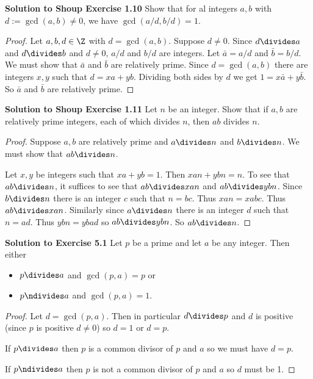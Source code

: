\documentclass[oneside,12pt]{amsart}
\begin{document}
\bigskip

\textbf{Solution to Shoup Exercise 1.10} Show that for al integers $a,b$ with $d:= \gcd(a,b) \not= 0$, we have $\gcd(a/d,b/d)=1$.
\begin{proof}
Let $a,b,d\in \Z$ with $d=\gcd(a,b)$. Suppose $d\not=0$.
Since $d\divides a$ and $d\divides b$ and $d\not=0$, $a/d$ and $b/d$ are
integers. Let $\bar{a}=a/d$ and $\bar{b}=b/d$. We must show that $\bar{a}$
and $\bar{b}$ are relatively prime.
Since $d=\gcd(a,b)$ there are integers $x,y$ such that $d=xa+yb$. Dividing
both sides by $d$ we get $1=x\bar{a}+y\bar{b}$. So $\bar{a}$ and $\bar{b}$ are relatively prime.
\end{proof}

\bigskip

\textbf{Solution to Shoup Exercise 1.11} Let $n$ be an integer. Show that if $a,b$ are relatively prime integers, each of which divides $n$, then $ab$ divides $n$.
\begin{proof}
Suppose $a,b$ are relatively prime and $a\divides n$ and $b\divides n$.
We must show that $ab\divides n$.

Let $x,y$ be integers such that $xa+yb=1$. Then $xan + ybn = n$.
To see that $ab\divides n$, it suffices to see that $ab\divides xan$ and
$ab\divides ybn$. Since $b\divides n$ there is an integer 
$c$ such that $n=bc$.
Thus $xan=xabc$. Thus $ab\divides xan$. Similarly since $a\divides n$ there
is an integer $d$ such that $n=ad$. Thus $ybn=ybad$ so $ab\divides ybn$.
So $ab\divides n$.
\end{proof}

\bigskip

\textbf{Solution to Exercise 5.1} Let $p$ be a prime and let $a$ be any integer. Then either
\begin{itemize}
\item $p\divides a$ and $\gcd(p,a)=p$ or
\item $p\ndivides a$ and $\gcd(p,a)=1$.
\end{itemize}
\begin{proof}
Let $d=\gcd(p,a)$. Then in particular $d\divides p$ and $d$ is positive (since $p$ is positive $d\not=0$) so $d=1$ or $d=p$.

If $p\divides a$ then $p$ is a common divisor of $p$ and $a$ so we must have $d=p$.

If $p\ndivides a$ then $p$ is not a common divisor of $p$ and $a$ so
$d$ must be 1.
\end{proof}

\bigskip
\end{document}
